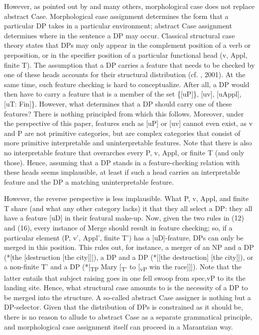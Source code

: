 \documentclass[output=paper
,modfonts
,nonflat]{langsci/langscibook}
\begin{document}
However, as pointed out by \citet{Legate2008} and many others, morphological case does not replace abstract Case. Morphological case assignment determines the form that a particular DP takes in a particular environment; abstract Case assignment determines where in the sentence a DP may occur. Classical structural case theory states that DPs may only appear in the complement position of a verb or preposition, or in the specifier position of a particular functional head (v, Appl, finite T). The assumption that a DP carries a feature that needs to be checked by one of these heads accounts for their structural distribution (cf. \citealt{Chomsky1995}, 2001). At the same time, such feature checking is hard to conceptualize. After all, a DP would then have to carry a feature that is a member of the set \{[uP]\}, [uv], [uAppl], [uT: Fin]\}. However, what determines that a DP should carry one of these features? There is nothing principled from which this follows. Moreover, under the perspective of this paper, features such as [uP] or [uv] cannot even exist, as v and P are not primitive categories, but are complex categories that consist of more primitive interpretable and uninterpretable features. Note that there is also no interpretable feature that overarches every P, v, Appl, or finite T (and only those). Hence, assuming that a DP stands in a feature-checking relation with these heads seems implausible, at least if such a head carries an interpretable feature and the DP a matching uninterpretable feature.

However, the reverse perspective is less implausible. What P, v, Appl, and finite T share (and what any other category lacks) it that they all select a DP: they all have a feature [uD] in their featural make-up. Now, given the two rules in (12) and (16), every instance of Merge should result in feature checking; so, if a particular element (P, v’, Appl’, finite T’) has a [uD]-feature, DPs can only be merged in this position. This rules out, for instance, a merger of an NP and a DP (*[the [destruction [the city]]]), a DP and a DP (*[[the destruction] [the city]]), or a non-finite T’ and a DP (*[\textsubscript{TP} Mary [\textsubscript{T’} to [\textsubscript{vP} win the race]]]). Note that the latter entails that subject raising goes in one fell swoop from spec,vP to its the landing site. Hence, what structural case amounts to is the necessity of a DP to be merged into the structure. A so-called abstract Case assigner is nothing but a DP-selector. Given that the distribution of DPs is constrained as it should be, there is no reason to allude to abstract Case as a separate grammatical principle, and morphological case assignment itself can proceed in a Marantzian way.
\end{document}

